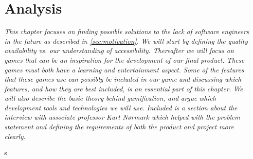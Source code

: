 \chapter{Analysis}
\label{cha:analysis}

\textit{This chapter focuses on finding possible solutions to the lack of software engineers in the future as described in \autoref{sec:motivation}. We will start by defining the quality availability vs. our understanding of accessibility. Thereafter we will focus on games that can be an inspiration for the development of our final product. These games must both have a learning and entertainment aspect. Some of the features that these games use can possibly be included in our game and discussing which features, and how they are best included, is an essential part of this chapter. We will also describe the basic theory behind gamification, and argue which development tools and technologies we will use. Included is a section about the interview with associate professor Kurt N{\o}rmark which helped with the problem statement and defining the requirements of both the product and project more clearly.}\newpage

%

%








s



